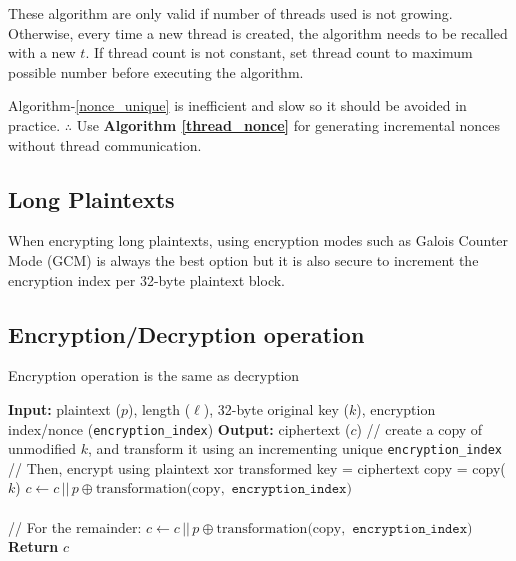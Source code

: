 \documentclass[11pt]{article}
\theoremstyle{definition}
\theoremstyle{remark}
\newcommand{\COMMENT}[1]{\State \textcolor[HTML]{003e57}{// #1}}
\begin{document}
These algorithm are only valid if number of threads used is not growing. Otherwise, every time a new thread is created, the algorithm needs to be recalled with a new $t$. If thread count is not constant, set thread count to maximum possible number before executing the algorithm.

Algorithm-\hspace{0.1em}\protect\ref{nonce_unique} is inefficient and slow so it should be avoided in practice.
$\therefore $ Use \textbf{Algorithm \hspace{0.1em}\protect\ref{thread_nonce}} for generating incremental nonces without thread communication.

\subsection {Long Plaintexts}

When encrypting long plaintexts, using encryption modes such as Galois Counter Mode (GCM) is always the best option but it is also secure to increment the encryption index per 32-byte plaintext block.

\subsection {Encryption/Decryption operation}

Encryption operation is the same as decryption

\begin{algorithm}[H] %
\caption{Encrypt/Decrypt transform Function}
\begin{algorithmic}[1]  %
\State \textbf{Input:} plaintext ($p$), length ($\ell$), 32-byte original key ($k$), encryption index/nonce (\texttt{encryption\_index})
\State \textbf{Output:} ciphertext ($c$)
	\COMMENT{create a copy of unmodified $k$, and transform it using an incrementing unique \texttt{encryption\_index}}
	\COMMENT{Then, encrypt using plaintext xor transformed key = ciphertext}
	\State copy = copy($k$)
	\State $c \gets c \,||\, p \oplus \mathrm{transformation(copy, } \texttt{  encryption\_index})$
\EndFor\\
\\
\COMMENT{For the remainder:}
\State $c \gets c \,||\, p \oplus \mathrm{transformation(copy, } \texttt{  encryption\_index})$
\State \textbf{Return} $c$
\end{algorithmic}
\end{algorithm}
\end{document}
